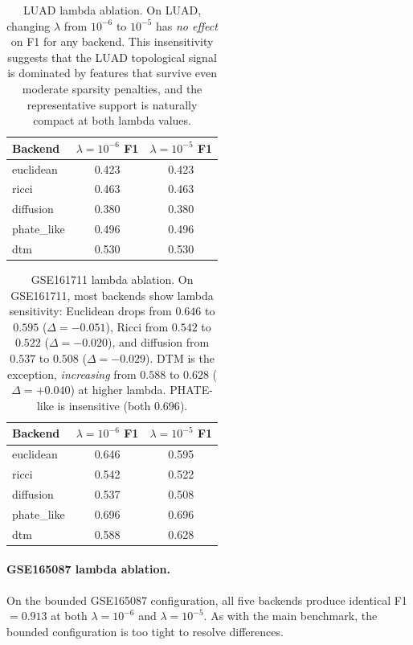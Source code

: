 \documentclass[11pt]{article}
\begin{document}
\begin{table}[h]
\centering
\small
\begin{tabular}{lcc}
\toprule
Backend & $\lambda = 10^{-6}$ F1 & $\lambda = 10^{-5}$ F1 \\
\midrule
euclidean & 0.423 & 0.423 \\
ricci & 0.463 & 0.463 \\
diffusion & 0.380 & 0.380 \\
phate\_like & 0.496 & 0.496 \\
dtm & 0.530 & 0.530 \\
\bottomrule
\end{tabular}
\caption{LUAD lambda ablation.
On LUAD, changing $\lambda$ from $10^{-6}$ to $10^{-5}$ has \emph{no effect} on F1 for any backend.
This insensitivity suggests that the LUAD topological signal is dominated by features that survive even moderate sparsity penalties, and the representative support is naturally compact at both lambda values.}
\label{tab:lambda_luad}
\end{table}

\begin{table}[h]
\centering
\small
\begin{tabular}{lcc}
\toprule
Backend & $\lambda = 10^{-6}$ F1 & $\lambda = 10^{-5}$ F1 \\
\midrule
euclidean & 0.646 & 0.595 \\
ricci & 0.542 & 0.522 \\
diffusion & 0.537 & 0.508 \\
phate\_like & 0.696 & 0.696 \\
dtm & 0.588 & 0.628 \\
\bottomrule
\end{tabular}
\caption{GSE161711 lambda ablation.
On GSE161711, most backends show lambda sensitivity: Euclidean drops from $0.646$ to $0.595$ ($\Delta = -0.051$), Ricci from $0.542$ to $0.522$ ($\Delta = -0.020$), and diffusion from $0.537$ to $0.508$ ($\Delta = -0.029$).
DTM is the exception, \emph{increasing} from $0.588$ to $0.628$ ($\Delta = +0.040$) at higher lambda.
PHATE-like is insensitive (both $0.696$).}
\label{tab:lambda_gse}
\end{table}

\paragraph{GSE165087 lambda ablation.}
On the bounded GSE165087 configuration, all five backends produce identical F1 $= 0.913$ at both $\lambda = 10^{-6}$ and $\lambda = 10^{-5}$.
As with the main benchmark, the bounded configuration is too tight to resolve differences.
\end{document}
